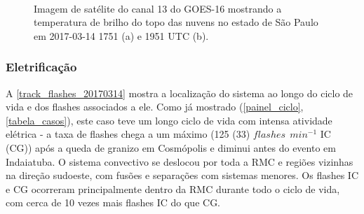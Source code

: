 %
\begin{figure}[hp]
	\begin{center}
		\caption{Imagem de satélite do canal 13 do GOES-16 mostrando a temperatura de brilho do topo das nuvens no estado de São Paulo em 2017-03-14 1751 (a) e 1951 UTC (b).} 
		\label{goes16_sp_20170314}
		 \\
	\end{center}
\end{figure}

\subsubsection{Eletrificação}\label{elec_201703014}

A \autoref{track_flashes_20170314} mostra a localização do sistema ao longo do ciclo de vida e dos flashes associados a ele. Como já mostrado (\autoref{painel_ciclo}, \autoref{tabela_casos}), este caso teve um longo ciclo de vida com intensa atividade elétrica - a taxa de flashes chega a um máximo (125 (33) $flashes\:\:min^{-1}$ IC (CG)) após a queda de granizo em Cosmópolis e diminui antes do evento em Indaiatuba. O sistema convectivo se deslocou por toda a RMC e regiões vizinhas na direção sudoeste, com fusões e separações com sistemas menores. Os flashes IC e CG ocorreram principalmente dentro da RMC durante todo o ciclo de vida, com cerca de 10 vezes mais flashes IC do que CG.

